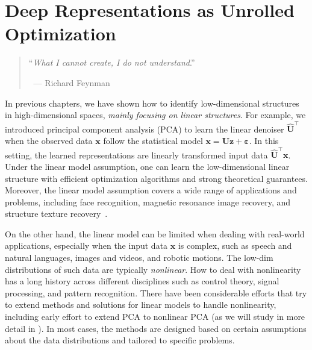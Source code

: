 \documentclass[../../book-main.tex]{subfiles}
\begin{document}
\chapter{Deep Representations as Unrolled Optimization}
\label{ch:deep-networks}

\begin{quote}
    \hfill    ``{\em What I cannot create, I do not understand}.''

    $~$ \hfill --- Richard Feynman
\end{quote}
\vspace{5mm}

In previous chapters, we have shown how to identify low-dimensional
structures in high-dimensional spaces, \textit{mainly focusing on
linear structures}.
For example, we introduced principal component analysis (PCA) to
learn the linear denoiser $\hat{\bm{U}}^{\top}$ when the observed
data $\bm{x}$ follow the statistical model $\bm{x} = \bm{U}\bm{z} +
\bm{\varepsilon}$.
In this setting, the learned representations are linearly transformed
input data $\hat{\bm{U}}^{\top}\bm{x}$.
Under the linear model assumption, one can learn the low-dimensional
linear structure with efficient optimization algorithms and strong
theoretical guarantees.
Moreover, the linear model assumption covers a wide range of
applications and problems, including face recognition, magnetic
resonance image recovery, and structure texture recovery~\cite{Wright-Ma-2022}.

On the other hand, the linear model can be limited when dealing with
real-world applications, especially when the input data $\bm{x}$ is
complex, such as speech and natural languages, images and videos, and
robotic motions. The low-dim distributions of such data are typically
{\em nonlinear}.
How to deal with nonlinearity has a long history across different
disciplines such as control theory, signal processing, and pattern
recognition.  There have been considerable efforts that try to extend
methods and solutions for linear models to handle nonlinearity,
including early effort to extend PCA to nonlinear PCA (as we will
study in more detail in ).  In
most cases, the
methods are designed based on certain assumptions about the data
distributions and tailored to specific problems.
\end{document}

